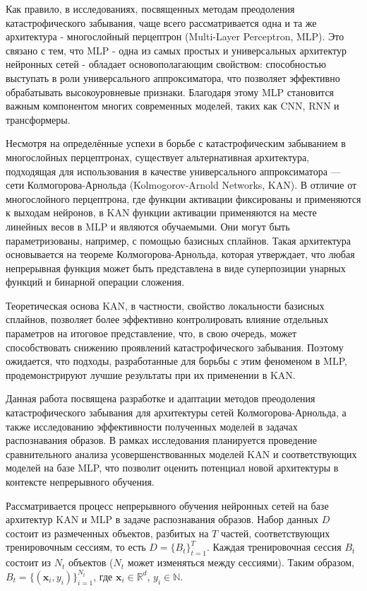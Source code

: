 \documentclass[a4paper,article,14pt]{extarticle}
\begin{document}
Как правило, в исследованиях, посвященных методам преодоления катастрофического 
забывания, чаще всего рассматривается одна и та же архитектура - многослойный 
перцептрон (Multi-Layer Perceptron, MLP). Это связано с тем, что MLP - одна из 
самых простых и универсальных архитектур нейронных сетей - обладает 
основополагающим свойством: способностью выступать в роли универсального 
аппроксиматора, что позволяет эффективно обрабатывать высокоуровневые признаки. 
Благодаря этому MLP становится важным компонентом многих современных моделей, 
таких как CNN, RNN и трансформеры.

Несмотря на определённые успехи в борьбе с катастрофическим забыванием в 
многослойных перцептронах, существует альтернативная архитектура, подходящая для 
использования в качестве универсального аппроксиматора — сети 
Колмогорова-Арнольда (Kolmogorov-Arnold Networks, KAN). В отличие от 
многослойного перцептрона, где функции активации фиксированы и применяются к 
выходам нейронов, в KAN функции активации применяются на месте линейных весов в 
MLP и являются обучаемыми. Они могут быть параметризованы, например, с помощью 
базисных сплайнов. Такая архитектура основывается на теореме 
Колмогорова-Арнольда, которая утверждает, что любая непрерывная функция может 
быть представлена в виде суперпозиции унарных функций и бинарной операции 
сложения.

Теоретическая основа KAN, в частности, свойство локальности базисных сплайнов, 
позволяет более эффективно контролировать влияние отдельных параметров на 
итоговое представление, что, в свою очередь, может способствовать снижению 
проявлений катастрофического забывания. Поэтому ожидается, что подходы, 
разработанные для борьбы с этим феноменом в MLP, продемонстрируют лучшие 
результаты при их применении в KAN.

Данная работа посвящена разработке и адаптации методов преодоления 
катастрофического забывания для архитектуры сетей Колмогорова-Арнольда, а также 
исследованию эффективности полученных моделей в задачах распознавания образов. В 
рамках исследования планируется проведение сравнительного анализа 
усовершенствованных моделей KAN и соответствующих моделей на базе MLP, что
позволит оценить потенциал новой архитектуры в контексте непрерывного
обучения.

\pagebreak


Рассматривается процесс непрерывного обучения нейронных сетей на базе архитектур
KAN и MLP в задаче распознавания образов. Набор данных \(D\) состоит из 
размеченных объектов, разбитых на \(T\) частей, соответствующих тренировочным 
сессиям, то есть \(D=\{B_t\}^T_{t=1}\). Каждая тренировочная сессия \(B_t\) 
состоит из \(N_t\) объектов (\(N_t\) может изменяться между сессиями). Таким 
образом, \(B_t=\{(\textbf{x}_i, y_i)\}^{N_t}_{i=1}\), где 
\(\textbf{x}_i\in\mathbb{R}^d\), \(y_i\in\mathbb{N}\).
\end{document}

